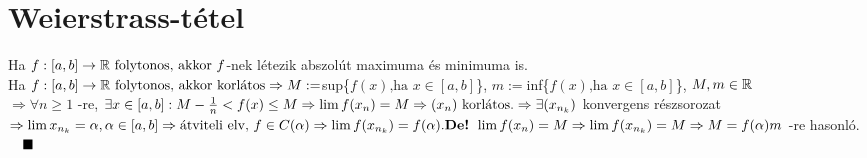 \documentclass[a4paper,12pt]{article}
\begin{document}
\section{Weierstrass-tétel}
	\tetel Ha $ f:[a,b]\to\mathbb{R}\text{ folytonos, akkor } f$-nek létezik abszolút maximuma és minimuma is.\\[0.1cm]
	\biz Ha $ f:[a,b]\to\mathbb{R}\text{ folytonos, akkor korlátos} \\[0.1cm] \Rightarrow M := $sup\{$f(x)\text{,ha } x \in [a,b]$\}, $m := $inf\{$f(x)\text{,ha } x \in [a,b]$\}, $M,m \in \mathbb{R}$\\[0.1cm] $\Rightarrow \forall n \geq 1$ -re, $\exists x \in [a,b]: M - \frac{1}{n} < f(x) \leq M\\[0.1cm] \Rightarrow \lim f(x_n) = M \Rightarrow(x_n)\text{ korlátos.}\\[0.1cm] \Rightarrow \exists (x_{n_k}) $ konvergens részsorozat$ \Rightarrow \lim x_{n_k} = \alpha, \alpha \in [a,b] \Rightarrow \text{átviteli elv, } f \in C(\alpha)\\[0.1cm] \Rightarrow \lim f(x_{n_k}) = f (\alpha). \\[0.1cm] \text{\textbf{De!} } \lim f(x_n) = M \Rightarrow \lim f (x_{n_k}) = M \Rightarrow M = f(\alpha) \\[0.1cm] m$ -re hasonló. $\quad\blacksquare$
\end{document}
